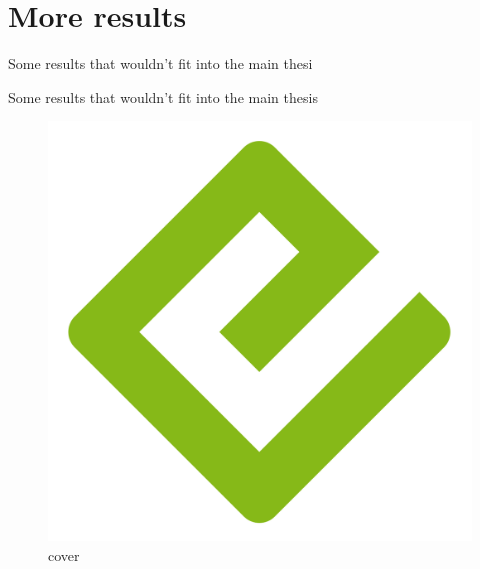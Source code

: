 \documentclass[
  a4paper,
]{scrbook}
\begin{document}
\hypertarget{sec-more-results}{%
\chapter{More results}\label{sec-more-results}}

Some results that wouldn't fit into the main thesi

Some results that wouldn't fit into the main thesis

\begin{figure}

{\centering \includegraphics{./cover.png}

}

\caption{cover}

\end{figure}


\backmatter
\end{document}
